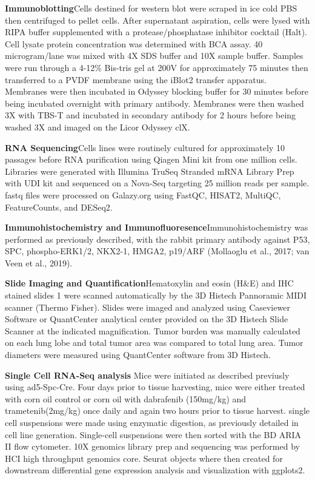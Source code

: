 \textbf{Immunoblotting}Cells destined for western blot were scraped in ice cold PBS then centrifuged to pellet cells. After supernatant aspiration, cells were lysed with RIPA buffer supplemented with a protease/phosphatase inhibitor cocktail (Halt). Cell lysate protein concentration was determined with BCA assay. 40 microgram/lane was mixed with 4X SDS buffer and 10X sample buffer. Samples were run through a 4-12\% Bis-tris gel at 200V for approximately 75 minutes then transferred to a PVDF membrane using the iBlot2 transfer apparatus. Membranes were then incubated in Odyssey blocking buffer for 30 minutes before being incubated overnight with primary antibody. Membranes were then washed 3X with TBS-T and incubated in secondary antibody for 2 hours before being washed 3X and imaged on the Licor Odyssey clX.

\textbf{RNA Sequencing}Cells lines were routinely cultured for approximately 10 passages before RNA purification using Qiagen Mini kit from one million cells. Libraries were generated with Illumina TruSeq Stranded mRNA Library Prep with UDI kit and sequenced on a Nova-Seq targeting 25 million reads per sample. fastq files were processed on Galazy.org using FastQC, HISAT2, MultiQC, FeatureCounts, and DESeq2.

\textbf{Immunohistochemistry and Immunofluoresence}Immunohistochemistry was performed as previously described, with the rabbit primary antibody against P53, SPC, phospho-ERK1/2, NKX2-1, HMGA2, p19/ARF (Mollaoglu et al., 2017; van Veen et al., 2019).

\textbf{Slide Imaging and Quantification}Hematoxylin and eosin (H\&E) and IHC stained slides 1 were scanned automatically by the 3D Histech Pannoramic MIDI scanner (Thermo Fisher). Slides were imaged and analyzed using Caseviewer Software or QuantCenter analytical center provided on the 3D Histech Slide Scanner at the indicated magnification. Tumor burden was manually calculated on each lung lobe and total tumor area was compared to total lung area. Tumor diameters were measured using QuantCenter software from 3D Histech.

\textbf{Single Cell RNA-Seq analysis} Mice were initiated as described previusly using ad5-Spc-Cre. Four days prior to tissue harvesting, mice were either treated with corn oil control or corn oil with dabrafenib (150mg/kg) and trametenib(2mg/kg) once daily and again two hours prior to tissue harvest. single cell suspensions were made using enzymatic digestion, as previously detailed in cell line generation. Single-cell suspensions were then sorted with the BD ARIA II flow cytometer. 10X genomics library prep and sequencing was performed by HCI high throughput genomics core. Seurat objects where then created for downstream differential gene expression analysis and visualization with ggplots2.

